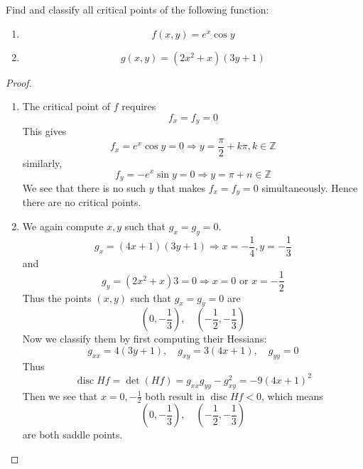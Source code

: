 \documentclass[openany]{book}
\newcommand{\Z}{\mathbb{Z}}
\DeclareMathOperator{\disc}{disc}
\begin{document}
\begin{prob}
    Find and classify all critical points of the following function:
    \begin{enumerate}
        \item \begin{equation*}
            f(x,y)=e^x\cos y
        \end{equation*}
        \item \begin{equation*}
            g(x,y)=(2x^2+x)(3y+1)
        \end{equation*}
    \end{enumerate}
\end{prob}
\begin{proof}
    \begin{enumerate}
        \item The critical point of $f$ requires 
        \begin{equation*}
            f_x=f_y=0
        \end{equation*}
        This gives 
        \begin{equation*}
            f_x=e^x\cos y=0\Rightarrow y=\frac{\pi}{2}+k\pi, k\in\Z
        \end{equation*}
        similarly,
        \begin{equation*}
            f_y=-e^x\sin y=0\Rightarrow y=\pi+n\in\Z
        \end{equation*}
        We see that there is no such $y$ that makes $f_x=f_y=0$ simultaneously. Hence there are no critical points.
        \item We again compute $x,y$ such that $g_x=g_y=0$.
        \begin{equation*}
            g_x=(4x+1)(3y+1)\Rightarrow x=-\frac{1}{4}, y=-\frac{1}{3}
        \end{equation*}
        and 
        \begin{equation*}
            g_y=(2x^2+x)3=0\Rightarrow x=0 \text{ or } x=-\frac{1}{2}
        \end{equation*}
        Thus the points $(x,y)$ such that $g_x=g_y=0$ are 
        \begin{equation*}
            \left(0,-\frac{1}{3}\right), \quad \left(-\frac{1}{2}, -\frac{1}{3}\right)
        \end{equation*}
        Now we classify them by first computing their Hessians:
        \begin{equation*}
            g_{xx}=4(3y+1), \quad g_{xy}=3(4x+1), \quad g_{yy}=0
        \end{equation*}
        Thus 
        \begin{equation*}
            \disc Hf=\det(Hf)=g_{xx}g_{yy}-g_{xy}^2=-9(4x+1)^2
        \end{equation*}
        Then we see that $x=0, -\frac{1}{2}$ both result in $\disc Hf<0$, which means 
        \begin{equation*}
            \left(0,-\frac{1}{3}\right), \quad \left(-\frac{1}{2}, -\frac{1}{3}\right)
        \end{equation*}
        are both saddle points.
    \end{enumerate}
\end{proof}
\end{document}
